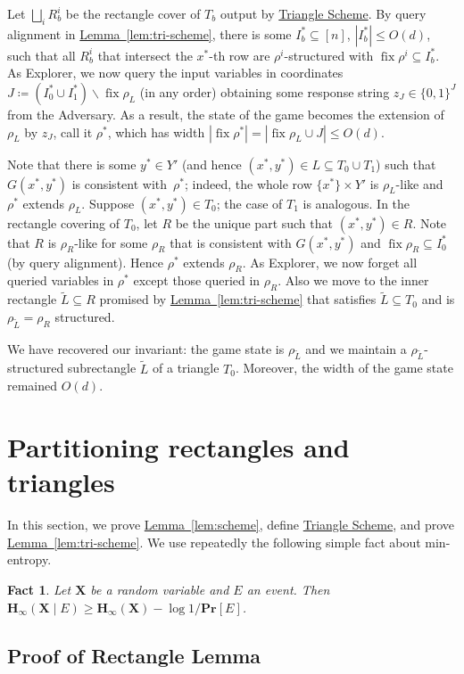 \documentclass[11pt]{article}
\numberwithin{equation}{section}
\newtheorem{fact}[theorem]{Fact}
\theoremstyle{definition}
\theoremstyle{plain}
\newcommand{\expref}[2]{\hyperref[#2]{#1~\ref{#2}}}
\newcommand{\rectlemma}{\expref{Lemma}{lem:scheme}\xspace}%
\newcommand{\trilemma}{\expref{Lemma}{lem:tri-scheme}\xspace}%
\newcommand{\trischeme}{\hyperref[alg:tri-partition]{Triangle Scheme}\xspace}
\renewcommand{\Pr}{\mathbf{Pr}}
\newcommand{\Hmin}{\mathbf{H}_\infty}
\DeclareMathOperator{\fix}{fix}
\newcommand{\X}{\bm{X}}
\begin{document}
Let $\bigsqcup_i R_b^i$ be the rectangle cover of $T_b$ output by \trischeme. By query alignment in \trilemma, there is some $I_b^*\subseteq [n]$, $|I_b^*|\leq O(d)$, such that all $R_b^i$ that intersect the $x^*$-th row are $\rho^i$-structured with $\fix\rho^i\subseteq I_b^*$. As Explorer, we now query the input variables in coordinates $J \coloneqq (I_0^* \cup I_1^*) \smallsetminus \fix\rho_{L}$ (in any order) obtaining some response string $z_J\in\{0,1\}^J$ from the Adversary. As a result, the state of the game becomes the extension of $\rho_{L}$ by $z_J$, call it $\rho^*$, which has width $|\!\fix\rho^*|=|\!\fix\rho_{L}\cup J|\leq O(d)$.

Note that there is some $y^*\in Y'$ (and hence $(x^*,y^*)\in L\subseteq T_0\cup T_1$) such that $G(x^*,y^*)$ is consistent with~$\rho^*$; indeed, the whole row $\{x^*\}\times Y'$ is $\rho_{L}$-like and $\rho^*$ extends $\rho_{L}$. Suppose $(x^*, y^*) \in T_0$; the case of $T_1$ is analogous. In the rectangle covering of $T_0$, let $R$ be the unique part such that $(x^*,y^*)\in R$. Note that $R$ is $\rho_{R}$-like for some $\rho_{R}$ that is consistent with $G(x^*,y^*)$ and $\fix\rho_{R}\subseteq I_0^*$ (by query alignment). Hence $\rho^*$ extends $\rho_{R}$. As Explorer, we now forget all queried variables in $\rho^*$ except those queried in $\rho_{R}$. Also we move to the inner rectangle $\widetilde{L} \subseteq R$ promised by \trilemma that satisfies $\widetilde{L} \subseteq T_0$ and is $\rho_{\widetilde{L}} = \rho_R$ structured.

We have recovered our invariant: the game state is $\rho_{\widetilde{L}}$ and we maintain a $\rho_{\widetilde{L}}$-structured subrectangle $\widetilde{L}$ of a triangle $T_0$. Moreover, the width of the game state remained $O(d)$.


\section{Partitioning rectangles and triangles} \label{sec:proof-rect-partition}

In this section, we prove \rectlemma, define \trischeme, and prove \trilemma. We use repeatedly the following simple fact about min-entropy.
\begin{fact} \label{fact:basic}
Let $\X$ be a random variable and $E$ an event. Then $\Hmin(\X\mid E)\geq \Hmin(\X)-\log 1/\Pr[E]$.
\end{fact}

\subsection{Proof of Rectangle Lemma}
\end{document}
